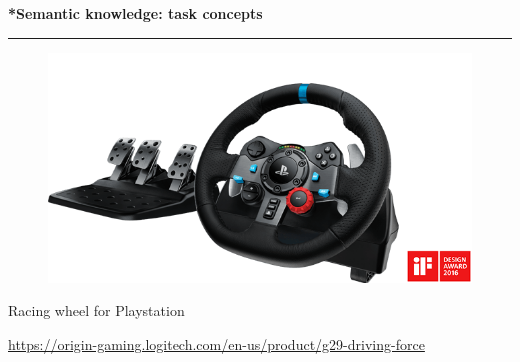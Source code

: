 \documentclass[pdf]{beamer}
\begin{document}
\begin{frame}
\vspace{8mm}
\textcolor{myBlue}{\textbf{\Large{*Semantic knowledge: task concepts}}}

\textcolor{red}{\rule{10cm}{1mm}}

  \begin{figure}
  \centering
  	\includegraphics[scale=0.4]{g29-racing-wheel.png} 
  \end{figure}

Racing wheel for Playstation

\url{https://origin-gaming.logitech.com/en-us/product/g29-driving-force}

\end{frame}
\end{document}
